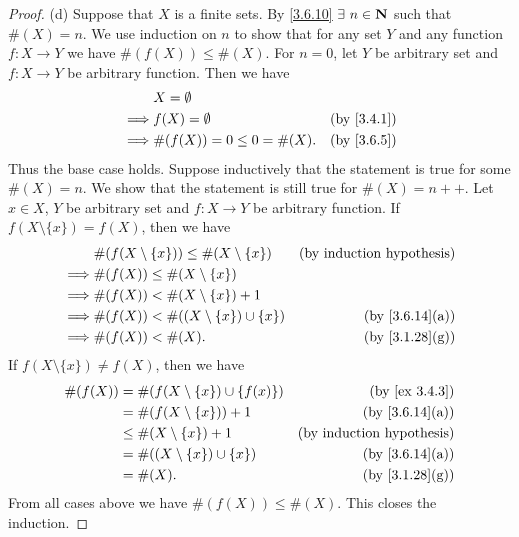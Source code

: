 \begin{proof}{(d)}
  Suppose that \(X\) is a finite sets.
  By \cref{3.6.10} \(\exists\ n \in \N\) such that \(\#(X) = n\).
  We use induction on \(n\) to show that for any set \(Y\) and any function \(f : X \to Y\) we have \(\#(f(X)) \leq \#(X)\).
  For \(n = 0\), let \(Y\) be arbitrary set and \(f : X \to Y\) be arbitrary function.
  Then we have
  \begin{align*}
             & X = \emptyset                                           \\
    \implies & f(X) = \emptyset             & \text{(by \cref{3.4.1})} \\
    \implies & \#(f(X)) = 0 \leq 0 = \#(X). & \text{(by \cref{3.6.5})}
  \end{align*}
  Thus the base case holds.
  Suppose inductively that the statement is true for some \(\#(X) = n\).
  We show that the statement is still true for \(\#(X) = n++\).
  Let \(x \in X\), \(Y\) be arbitrary set and \(f : X \to Y\) be arbitrary function.
  If \(f(X \setminus \{x\}) = f(X)\), then we have
  \begin{align*}
             & \#(f(X \setminus \{x\})) \leq \#(X \setminus \{x\}) & \text{(by induction hypothesis)} \\
    \implies & \#(f(X)) \leq \#(X \setminus \{x\})                                                    \\
    \implies & \#(f(X)) < \#(X \setminus \{x\}) + 1                                                   \\
    \implies & \#(f(X)) < \#((X \setminus \{x\}) \cup \{x\})       & \text{(by \cref{3.6.14}(a))}     \\
    \implies & \#(f(X)) < \#(X).                                   & \text{(by \cref{3.1.28}(g))}
  \end{align*}
  If \(f(X \setminus \{x\}) \neq f(X)\), then we have
  \begin{align*}
    \#(f(X)) & = \#(f(X \setminus \{x\}) \cup \{f(x)\}) & \text{(by \cref{ex 3.4.3})}      \\
             & = \#(f(X \setminus \{x\})) + 1           & \text{(by \cref{3.6.14}(a))}     \\
             & \leq \#(X \setminus \{x\}) + 1           & \text{(by induction hypothesis)} \\
             & = \#((X \setminus \{x\}) \cup \{x\})     & \text{(by \cref{3.6.14}(a))}     \\
             & = \#(X).                                 & \text{(by \cref{3.1.28}(g))}
  \end{align*}
  From all cases above we have \(\#(f(X)) \leq \#(X)\).
  This closes the induction.


\end{proof}
